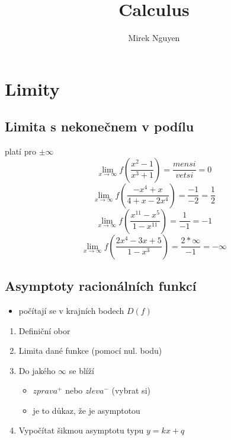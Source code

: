 \documentclass{article}
\begin{document}
\title{Calculus}
\author{Mirek Nguyen}

\maketitle

\section{Limity}
\subsection{Limita s nekonečnem v podílu}
platí pro $\pm\infty$ \newline
\begin{equation}
  \lim_{x \to \infty}f(\frac{x^2-1}{x^3+1})=\frac{mensi}{vetsi}=0
\end{equation}
\begin{equation}
  \lim_{x \to \infty}f(\frac{-x^4+x}{4+x-2x^4})=\frac{-1}{-2}=\frac{1}{2}
\end{equation}
\begin{equation}
  \lim_{x \to \infty}f(\frac{x^{11}-x^5}{1-x^{11}})=\frac{1}{-1}=-1
\end{equation}
\begin{equation}
  \lim_{x \to \infty}f(\frac{2x^4-3x+5}{1-x^3})=\frac{2*\infty}{-1}=-\infty
\end{equation}


\subsection{Asymptoty racionálních funkcí}
\begin{itemize}
  \item počítají se v krajních bodech $D(f)$
\end{itemize}
\begin{enumerate}
  \item Definiční obor
  \item Limita dané funkce (pomocí nul. bodu)
  \item Do jakého $\infty$ se blíží
    \begin{itemize}
      \item $zprava^+$ nebo $zleva^-$ (vybrat si)
      \item je to důkaz, že je asymptotou
    \end{itemize}
  \item Vypočítat šikmou asymptotu typu $y=kx+q$
\end{enumerate}
\end{document}
